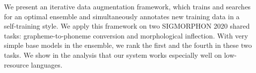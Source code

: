 We present an iterative data augmentation framework, which trains and searches for an optimal ensemble and simultaneously annotates new training data in a self-training style. We apply this framework on two SIGMORPHON 2020 shared tasks: grapheme-to-phoneme conversion and morphological inflection. With very simple base models in the ensemble, we rank the first and the fourth in these two tasks. We show in the analysis that our system works especially well on low-resource languages.
